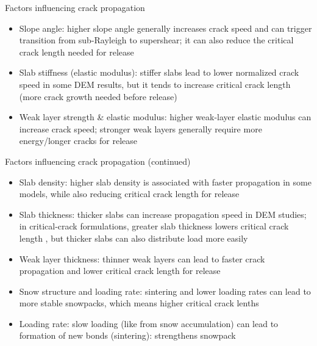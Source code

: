 \documentclass[11pt,aspectratio=169]{beamer}
\begin{document}
\begin{frame}{Factors influencing crack propagation}
    \begin{itemize}
        \item Slope angle: higher slope angle generally increases crack speed and can trigger transition from sub-Rayleigh to supershear; it can also reduce the critical crack length needed for release \parencite{bobillierNumericalInvestigationCrack2024, trottetTransitionSubRayleighAnticrack2022, gaumeSnowFractureRelation2017a}
        \item Slab stiffness (elastic modulus): stiffer slabs lead to lower normalized crack speed in some DEM results, but it tends to increase critical crack length (more crack growth needed before release) \parencite{bobillierNumericalInvestigationCrack2024, gaumeSnowFractureRelation2017a}
        \item Weak layer strength \& elastic modulus: higher weak-layer elastic modulus can increase crack speed; stronger weak layers generally require more energy/longer cracks for release \parencite{bobillierNumericalInvestigationCrack2024, gaumeSnowFractureRelation2017a, gaumeModelingCrackPropagation2015}
    
    \end{itemize}
\end{frame}

\begin{frame}{Factors influencing crack propagation (continued)}
    \begin{itemize}
        \item Slab density: higher slab density is associated with faster propagation in some models, while also reducing critical crack length for release \parencite{gaumeModelingCrackPropagation2015, gaumeSnowFractureRelation2017a}
        \item Slab thickness: thicker slabs can increase propagation speed in DEM studies; in critical-crack formulations, greater slab thickness lowers critical crack length \parencite{gaumeModelingCrackPropagation2015, gaumeSnowFractureRelation2017a}, but thicker slabs can also distribute load more easily \parencite{rosendahlModelingSnowSlab2020}
        \item Weak layer thickness: thinner weak layers can lead to faster crack propagation and lower critical crack length for release \parencite{gaumeModelingCrackPropagation2015, gaumeSnowFractureRelation2017a}
        \item Snow structure and loading rate: sintering and lower loading rates can lead to more stable snowpacks, which means higher critical crack lenths \parencite{mulakNumericalInvestigationMixedmode2019}
        \item Loading rate: slow loading (like from snow accumulation) can lead to formation of new bonds (sintering): strengthens snowpack \parencite{mulakNumericalInvestigationMixedmode2019}
    \end{itemize}
    
\end{frame}
\end{document}
